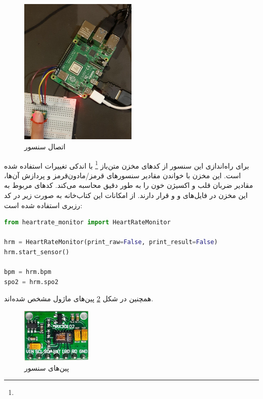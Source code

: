 \begin{figure}[h]
	\centering
	\includegraphics[width=0.5\textwidth]{figs/max30102.jpg}
	
	\caption{اتصال سنسور }
	\label{fig:5}
\end{figure}


برای راه‌اندازی این سنسور از کدهای مخزن ‌متن‌باز 
\footnote{}
با اندکی تغییرات
 استفاده شده است. این مخزن با خواندن مقادیر سنسورهای قرمز/مادون‌قرمز و پردازش آن‌ها، مقادیر ضربان قلب و اکسیژن خون را به طور دقیق محاسبه می‌کند. کدهای مربوط به این مخزن در فایل‌های 
 و
 و 
 قرار دارند.
از امکانات این کتاب‌خانه به صورت زیر در کد رزبری استفاده شده است:

\begin{latin}
	\begin{lstlisting}[language=python]
from heartrate_monitor import HeartRateMonitor

hrm = HeartRateMonitor(print_raw=False, print_result=False)
hrm.start_sensor()

bpm = hrm.bpm
spo2 = hrm.spo2

\end{lstlisting}
\end{latin}


	همچنین در شکل \ref{fig:16} پین‌های ماژول  مشخص شده‌اند.
	
	\begin{figure}[h]
		\centering
		\includegraphics[width=0.3\textwidth]{figs/MAX30102-2.jpg}
		
		\caption{پین‌های سنسور }
		\label{fig:16}
	\end{figure}

